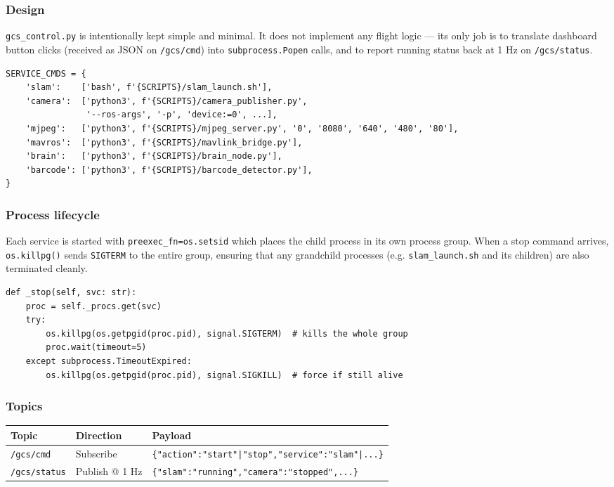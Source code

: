 \documentclass[11pt,a4paper]{article}
\begin{document}
\subsubsection{Design}

\texttt{gcs\_control.py} is intentionally kept simple and minimal. It does not
implement any flight logic — its only job is to translate dashboard button
clicks (received as JSON on \texttt{/gcs/cmd}) into \texttt{subprocess.Popen}
calls, and to report running status back at 1 Hz on \texttt{/gcs/status}.

\begin{lstlisting}[style=python, caption=Service command table in gcs\_control.py]
SERVICE_CMDS = {
    'slam':    ['bash', f'{SCRIPTS}/slam_launch.sh'],
    'camera':  ['python3', f'{SCRIPTS}/camera_publisher.py',
                '--ros-args', '-p', 'device:=0', ...],
    'mjpeg':   ['python3', f'{SCRIPTS}/mjpeg_server.py', '0', '8080', '640', '480', '80'],
    'mavros':  ['python3', f'{SCRIPTS}/mavlink_bridge.py'],
    'brain':   ['python3', f'{SCRIPTS}/brain_node.py'],
    'barcode': ['python3', f'{SCRIPTS}/barcode_detector.py'],
}
\end{lstlisting}

\subsubsection{Process lifecycle}

Each service is started with \texttt{preexec\_fn=os.setsid} which places the
child process in its own process group. When a stop command arrives,
\texttt{os.killpg()} sends \texttt{SIGTERM} to the entire group, ensuring that
any grandchild processes (e.g. \texttt{slam\_launch.sh} and its children) are
also terminated cleanly.

\begin{lstlisting}[style=python, caption=Clean process-group termination]
def _stop(self, svc: str):
    proc = self._procs.get(svc)
    try:
        os.killpg(os.getpgid(proc.pid), signal.SIGTERM)  # kills the whole group
        proc.wait(timeout=5)
    except subprocess.TimeoutExpired:
        os.killpg(os.getpgid(proc.pid), signal.SIGKILL)  # force if still alive
\end{lstlisting}

\subsubsection{Topics}

\begin{center}
\begin{tabular}{llp{6cm}}
  \toprule
  \textbf{Topic} & \textbf{Direction} & \textbf{Payload} \\
  \midrule
  \texttt{/gcs/cmd}    & Subscribe & \texttt{\{"action":"start"|"stop","service":"slam"|...\}} \\
  \texttt{/gcs/status} & Publish @ 1 Hz & \texttt{\{"slam":"running","camera":"stopped",...\}} \\
  \bottomrule
\end{tabular}
\end{center}
\end{document}
